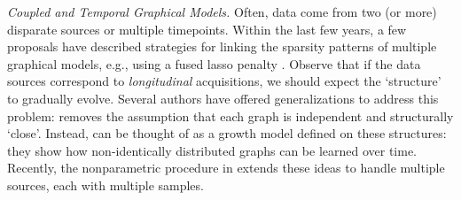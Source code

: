 {\em Coupled and Temporal Graphical Models.} 
Often, data come from two (or more) disparate sources or multiple timepoints.
Within the last few years, a few proposals have 
described strategies for linking the sparsity patterns of multiple graphical models, e.g., using a fused lasso 
penalty \cite{danaher2014joint} \cite{yang2015fused}. Observe that 
if the data sources correspond to {\em longitudinal} acquisitions, we should expect 
the `structure' to gradually evolve.
Several authors have offered generalizations to address this problem: \cite{zhou2010time} removes the assumption
that each graph is independent and structurally `close'.
Instead, \cite{zhou2010time} can be thought of as a growth model \cite{mcardle2000introduction} defined on these structures: they show how non-identically distributed graphs can be learned over time. 
Recently, the nonparametric procedure in \cite{qiu2015joint} extends these ideas
to handle multiple sources, each with multiple samples.

